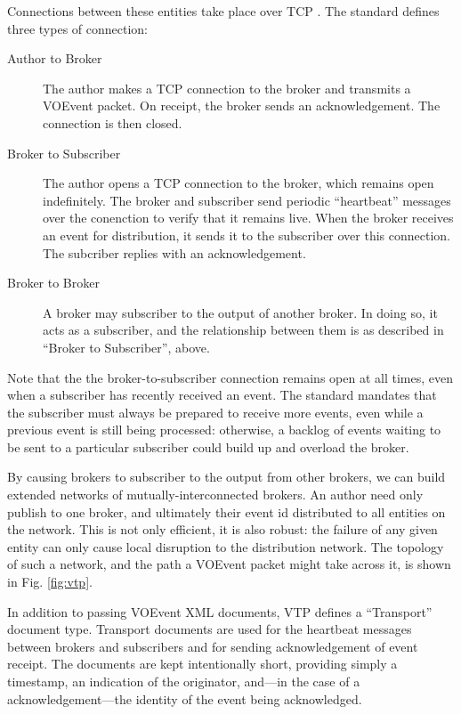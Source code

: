 \documentclass[5p,authoryear]{elsarticle}
\begin{document}
Connections between these entities take place over TCP \citep{Cerf:1974}. The
standard defines three types of connection:

\begin{description}

  \item[Author to Broker]{The author makes a TCP connection to the broker and
  transmits a VOEvent packet. On receipt, the broker sends an acknowledgement.
  The connection is then closed.}

  \item[Broker to Subscriber]{The author opens a TCP connection to the broker,
  which remains open indefinitely. The broker and subscriber send periodic
  ``heartbeat'' messages over the conenction to verify that it remains live.
  When the broker receives an event for distribution, it sends it to the
  subscriber over this connection. The subcriber replies with an
  acknowledgement.}

  \item[Broker to Broker]{A broker may subscriber to the output of another
  broker. In doing so, it acts as a subscriber, and the relationship between
  them is as described in ``Broker to Subscriber'', above.}

\end{description}

Note that the the broker-to-subscriber connection remains open at all times,
even when a subscriber has recently received an event. The standard mandates
that the subscriber must always be prepared to receive more events, even while
a previous event is still being processed: otherwise, a backlog of events
waiting to be sent to a particular subscriber could build up and overload the
broker.

By causing brokers to subscriber to the output from other brokers, we can
build extended networks of mutually-interconnected brokers. An author need
only publish to one broker, and ultimately their event id distributed to all
entities on the network. This is not only efficient, it is also robust: the
failure of any given entity can only cause local disruption to the
distribution network. The topology of such a network, and the path a VOEvent
packet might take across it, is shown in Fig. \ref{fig:vtp}.

In addition to passing VOEvent XML documents, VTP defines a ``Transport''
document type. Transport documents are used for the heartbeat messages between
brokers and subscribers and for sending acknowledgement of event receipt. The
documents are kept intentionally short, providing simply a timestamp, an
indication of the originator, and---in the case of a acknowledgement---the
identity of the event being acknowledged.
\end{document}
